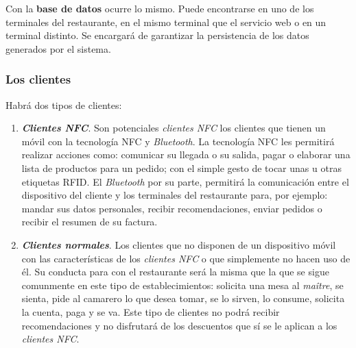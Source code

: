   Con la \textbf{base de datos} ocurre lo mismo. Puede encontrarse en uno de
  los terminales del restaurante, en el mismo terminal que el servicio web o
  en un terminal distinto. Se encargará de garantizar la persistencia de los
  datos generados por el sistema.



    \subsubsection{Los clientes}
    \label{subsubsec:clients}
  Habrá dos tipos de clientes:
  \begin{enumerate}
  \item \emph{\textbf{Clientes \acs{NFC}}}. Son potenciales \emph{clientes
  \acs{NFC}} los clientes que tienen un móvil con la tecnología \acs{NFC} y
  \emph{Bluetooth}. La tecnología \acs{NFC} les permitirá realizar acciones
  como: comunicar su llegada o su salida, pagar o elaborar una lista de
  productos para un pedido; con el simple gesto de tocar unas u otras
  etiquetas \acs{RFID}. El \emph{Bluetooth} por su parte, permitirá la
  comunicación entre el dispositivo del cliente y los terminales del
  restaurante para, por ejemplo: mandar sus datos personales, recibir
  recomendaciones, enviar pedidos o recibir el resumen de su factura.
  \item \emph{\textbf{Clientes normales}}. Los clientes que no disponen
  de un dispositivo móvil con las características de los \emph{clientes
  \acs{NFC}} o que simplemente no hacen uso de él. Su conducta para con
  el restaurante será la misma que la que se sigue comunmente en este tipo
  de establecimientos: solicita una mesa al \emph{maître}, se sienta,
  pide al camarero lo que desea tomar, se lo sirven, lo consume, solicita
  la cuenta, paga y se va. Este tipo de clientes no podrá recibir
  recomendaciones y no disfrutará de los descuentos que sí se le aplican
  a los \emph{clientes \acs{NFC}}.
  \end{enumerate}

